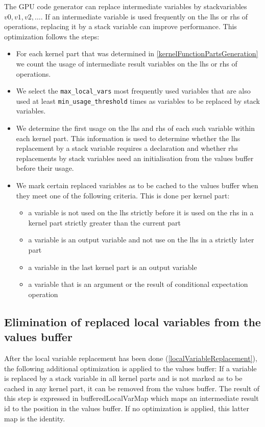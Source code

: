 \documentclass[12pt, a4paper]{article}
\begin{document}
The GPU code generator can replace intermediate variables by stackvariables $v0, v1, v2, \ldots$. If an intermediate
variable is used frequently on the lhs or rhs of operations, replacing it by a stack variable can improve
performance. This optimization follows the steps:

\begin{itemize}
\item For each kernel part that was determined in \ref{kernelFunctionPartsGeneration} we count the usage of intermediate
  result variables on the lhs or rhs of operations.
\item We select the \verb+max_local_vars+ most frequently used variables that are also used at least
  \verb+min_usage_threshold+ times as variables to be replaced by stack variables.
\item We determine the first usage on the lhs and rhs of each such variable within each kernel part. This information is
  used to determine whether the lhs replacement by a stack variable requires a declaration and whether rhs replacements
  by stack variables need an initialisation from the values buffer before their usage.
\item We mark certain replaced variables as to be cached to the values buffer when they meet one of the following
  criteria. This is done per kernel part:
\begin{itemize}
\item a variable is not used on the lhs strictly before it is used on the rhs in a kernel part strictly greater than the
  current part
\item a variable is an output variable and not use on the lhs in a strictly later part
\item a variable in the last kernel part is an output variable
\item a variable that is an argument or the result of conditional expectation operation
\end{itemize}
\end{itemize}

\subsection{Elimination of replaced local variables from the values buffer}

After the local variable replacement has been done (\ref{localVariableReplacement}), the following additional
optimization is applied to the values buffer: If a variable is replaced by a stack variable in all kernel parts and is
not marked as to be cached in any kernel part, it can be removed from the values buffer. The result of this step is
expressed in bufferedLocalVarMap which maps an intermediate result id to the position in the values buffer. If no
optimization is applied, this latter map is the identity.


\end{document}

